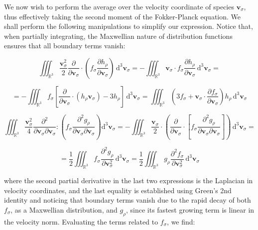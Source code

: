 We now wish to perform the average over the velocity coordinate of species $\mathbf{v}_\sigma$, thus effectively taking the second moment of the Fokker-Planck equation. We shall perform the following manipulations to simplify our expression. Notice that, when partially integrating, the Maxwellian nature of distribution functions ensures that all boundary terms vanish:

\begin{equation}
    \iiint_{\mathbb{R}^3}\frac{\mathbf{v}_\sigma^2}{2}\frac{\partial}{\partial\mathbf{v}_\sigma}\cdot\left(f_\sigma\frac{\partial h_\rho}{\partial\mathbf{v}_\sigma}\right)\,\mathrm{d}^3\mathbf{v}_\sigma=-\iiint_{\mathbb{R}^3}\mathbf{v}_\sigma\cdot f_\sigma\frac{\partial h_\rho}{\partial\mathbf{v}_\sigma}\,\mathrm{d}^3\mathbf{v}_\sigma=
\end{equation}

\begin{equation}
    =-\iiint_{\mathbb{R}^3}f_\sigma\left[\frac{\partial}{\partial\mathbf{v}_\sigma}\cdot(h_\rho\mathbf{v}_\sigma)-3h_\rho\right]\,\mathrm{d}^3\mathbf{v}_\sigma=\iiint_{\mathbb{R}^3}\left(3f_\sigma+\mathbf{v}_\sigma\cdot\frac{\partial f_\sigma}{\partial\mathbf{v}_\sigma}\right)h_\rho\,\mathrm{d}^3\mathbf{v}_\sigma
\end{equation}

\begin{equation}
    \iiint_{\mathbb{R}^3}\frac{\mathbf{v}_\sigma^2}{4}\frac{\partial^2}{\partial\mathbf{v}_\sigma\partial\mathbf{v}_\sigma}:\left(f_\sigma\frac{\partial^2g_\rho}{\partial\mathbf{v}_\sigma\partial\mathbf{v}_\sigma}\right)\mathrm{d}^3\mathbf{v}_\sigma=-\iiint_{\mathbb{R}^3}\frac{\mathbf{v}_\sigma}{2}\cdot\left(\frac{\partial}{\partial\mathbf{v}_\sigma}\cdot\left[f_\sigma\frac{\partial^2g_\rho}{\partial\mathbf{v}_\sigma\partial\mathbf{v}_\sigma}\right]\right)\,\mathrm{d}^3\mathbf{v}_\sigma=
\end{equation}

\begin{equation}
    =\frac{1}{2}\iiint_{\mathbb{R}^3}f_\sigma\frac{\partial^2g_\rho}{\partial\mathbf{v}_\sigma^2}\,\mathrm{d}^3\mathbf{v}_\sigma=\frac{1}{2}\iiint_{\mathbb{R}^3}g_\rho\frac{\partial^2f_\sigma}{\partial\mathbf{v}_\sigma^2}\,\mathrm{d}^3\mathbf{v}_\sigma
\end{equation}

where the second partial derivative in the last two expressions is the Laplacian in velocity coordinates, and the last equality is established using Green's 2nd identity and noticing that boundary terms vanish due to the rapid decay of both $f_\sigma$, as a Maxwellian distribution, and $g_\rho$, since its fastest growing term is linear in the velocity norm. Evaluating the terms related to $f_\sigma$, we find:

